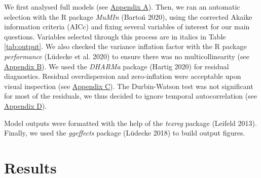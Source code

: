 \documentclass[smallextended]{svjour3}       %
\begin{document}
\bigbreak

We first analysed full models (see \hyperlink{appendix-a}{Appendix A}).
Then, we ran an automatic selection with the R package \emph{MuMIn}
(Bartoń 2020), using the corrected Akaike information criteria (AICc)
and fixing several variables of interest for our main questions.
Variables selected through this process are in italics in Table
\ref{tab:output}. We also checked the variance inflation factor with the
R package \emph{performance} (Lüdecke et al. 2020) to ensure there was
no multicollinearity (see \hyperlink{appendix-b}{Appendix B}). We used
the \emph{DHARMa} package (Hartig 2020) for residual diagnostics.
Residual overdispersion and zero-inflation were acceptable upon visual
inspection (see \hyperlink{appendix-c}{Appendix C}). The Durbin-Watson
test was not significant for most of the residuals, we thus decided to
ignore temporal autocorrelation (see
\hyperlink{appendix-d}{Appendix D}).

Model outputs were formatted with the help of the \emph{texreg} package
(Leifeld 2013). Finally, we used the \emph{ggeffects} package (Lüdecke
2018) to build output figures.

\hypertarget{results}{%
\section{Results}\label{results}}
\end{document}
